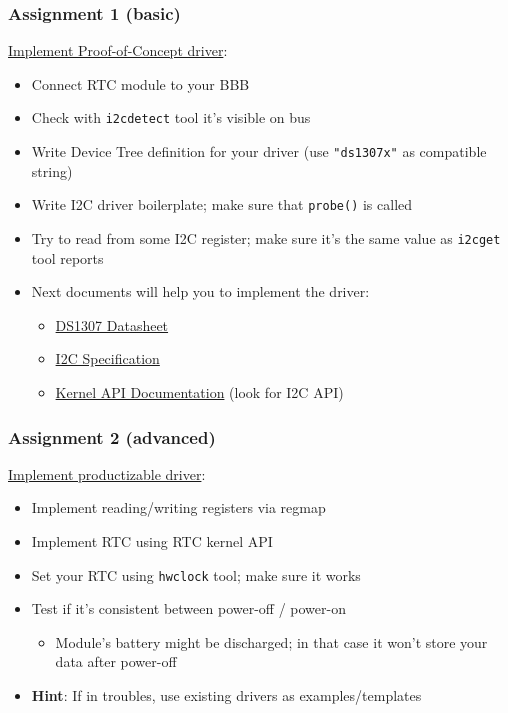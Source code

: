 \begin{frame}
  \frametitle{Assignment 1 (basic)}
  \underline{Implement Proof-of-Concept driver}:
  \begin{itemize}
    \item Connect RTC module to your BBB
    \item Check with \texttt{i2cdetect} tool it's visible on bus
    \item Write Device Tree definition for your driver (use \texttt{"ds1307x"}
          as compatible string)
    \item Write I2C driver boilerplate; make sure that \texttt{probe()} is
          called
    \item Try to read from some I2C register; make sure it's the same value as
          \texttt{i2cget} tool reports
    \item Next documents will help you to implement the driver:
    \begin{itemize}
      \item \href{https://datasheets.maximintegrated.com/en/ds/DS1307.pdf}
                 {DS1307 Datasheet}
      \item \href {https://www.nxp.com/docs/en/user-guide/UM10204.pdf}
                  {I2C Specification}
      \item \href {https://www.kernel.org/doc/html/v4.19/}
                  {Kernel API Documentation} (look for I2C API)
    \end{itemize}
  \end{itemize}
\end{frame}

\begin{frame}
  \frametitle{Assignment 2 (advanced)}
  \underline{Implement productizable driver}:
  \begin{itemize}
    \item Implement reading/writing registers via regmap
    \item Implement RTC using RTC kernel API
    \item Set your RTC using \texttt{hwclock} tool; make sure it works
    \item Test if it's consistent between power-off / power-on
    \begin{itemize}
      \item Module's battery might be discharged; in that case it won't store
            your data after power-off
    \end{itemize}
    \item \textbf{Hint}: If in troubles, use existing drivers as
          examples/templates
  \end{itemize}
\end{frame}

